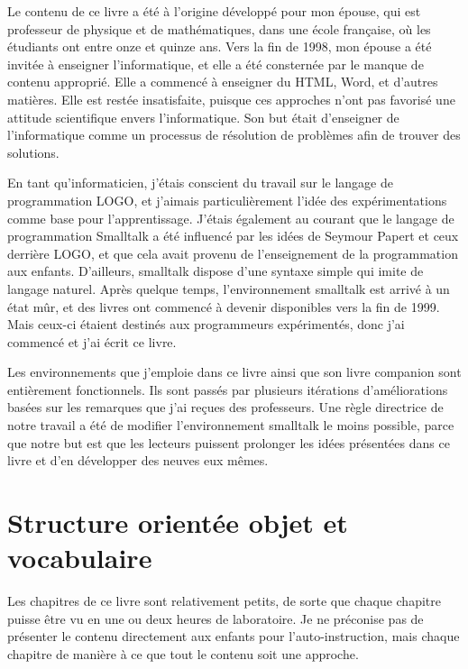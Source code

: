 \documentclass[a4paper,10pt,twoside]{book}
\begin{document}
Le contenu de ce livre a \'et\'e \`a l'origine d\'evelopp\'e pour mon \'epouse, qui est professeur de physique et de math\'ematiques, dans une \'ecole fran\c caise, o\`u les \'etudiants ont entre onze et quinze ans. Vers la fin de 1998, mon \'epouse a \'et\'e invit\'ee \`a enseigner l'informatique, et elle a \'et\'e constern\'ee par le manque de contenu appropri\'e. Elle a commenc\'e \`a enseigner du HTML, Word, et d'autres mati\`eres. Elle est rest\'ee insatisfaite, puisque ces approches n'ont pas favoris\'e une attitude scientifique envers l'informatique. Son but \'etait d'enseigner de l'informatique comme un processus de r\'esolution de probl\`emes afin de trouver des solutions.

En tant qu'informaticien, j'\'etais conscient du travail sur le langage de programmation LOGO, et j'aimais particuli\`erement l'id\'ee des  exp\'erimentations comme base pour l'apprentissage. J'\'etais \'egalement au courant que le langage de programmation Smalltalk a \'et\'e influenc\'e par les id\'ees de Seymour Papert et ceux derri\`ere LOGO, et que cela avait provenu de l'enseignement de la programmation aux enfants. D'ailleurs, smalltalk dispose d'une syntaxe simple qui imite de langage naturel. Apr\`es quelque temps, l'environnement smalltalk est arriv\'e \`a un \'etat m\^ur, et des livres ont commenc\'e \`a devenir disponibles vers la fin de 1999. Mais ceux-ci \'etaient destin\'es aux programmeurs exp\'eriment\'es, donc j'ai commenc\'e et j'ai \'ecrit ce livre.

Les environnements que j'emploie dans ce livre ainsi que son livre companion  sont enti\`erement fonctionnels. Ils sont pass\'es par plusieurs it\'erations d'am\'eliorations bas\'ees sur les remarques que j'ai re\c cues des professeurs. Une r\`egle directrice de notre travail a \'et\'e de modifier l'environnement smalltalk le moins possible, parce que notre but est que les lecteurs puissent prolonger les id\'ees pr\'esent\'ees dans ce livre et d'en d\'evelopper des neuves eux m\^emes.

\section*{Structure orient\'ee objet et vocabulaire}

Les chapitres de ce livre sont relativement petits, de sorte que chaque chapitre puisse \^etre vu en une ou deux heures de laboratoire. Je ne pr\'econise pas de pr\'esenter le contenu directement aux enfants pour l'auto-instruction, mais chaque chapitre de mani\`ere \`a ce que tout le contenu soit une approche.
\end{document}
